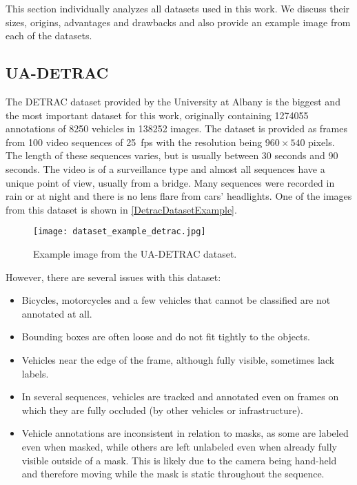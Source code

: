 
This section individually analyzes all datasets used in this work. We discuss
their sizes, origins, advantages and drawbacks and also provide an example image
from each of the datasets.


\subsection{UA-DETRAC}
\label{DetracDataset}

The DETRAC dataset \cite{detrac} provided by the University at Albany is the
biggest and the most important dataset for this work, originally containing
\num{1274055} annotations of \num{8250} vehicles in \num{138252} images. The
dataset is provided as frames from 100 video sequences of \SI{25}{fps} with the
resolution being $960 \times 540$ pixels. The length of these sequences varies,
but is usually between 30 seconds and 90 seconds. The video is of a surveillance
type and almost all sequences have a unique point of view, usually from a
bridge. Many sequences were recorded in rain or at night and there is no lens
flare from cars' headlights. One of the images from this dataset is shown in
\autoref{DetracDatasetExample}.

\begin{figure}[h]
    \centering
    \texttt{[image: dataset\_example\_detrac.jpg]}
    \caption{Example image from the UA-DETRAC dataset.}
    \label{DetracDatasetExample}
\end{figure}

However, there are several issues with this dataset:
\begin{itemize}
    \item Bicycles, motorcycles and a few vehicles that cannot be classified are
    not annotated at all.
    \item Bounding boxes are often loose and do not fit tightly to the objects.
    \item Vehicles near the edge of the frame, although fully visible, sometimes
    lack labels.
    \item In several sequences, vehicles are tracked and annotated even on
    frames on which they are fully occluded (by other vehicles or
    infrastructure).
    \item Vehicle annotations are inconsistent in relation to masks, as some are
    labeled even when masked, while others are left unlabeled even when already
    fully visible outside of a mask. This is likely due to the camera being
    hand-held and therefore moving while the mask is static throughout the
    sequence.
\end{itemize}

